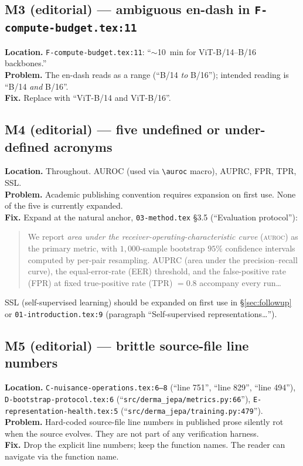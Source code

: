 \documentclass[11pt,a4paper]{article}
\begin{document}
\subsection*{M3 (editorial) --- ambiguous en-dash in
            \texttt{F-compute-budget.tex:11}}
\textbf{Location.} \texttt{F-compute-budget.tex:11}: ``$\sim$10~min for
ViT-B/14--B/16 backbones.''\\
\textbf{Problem.} The en-dash reads as a range (``B/14 \emph{to}
B/16''); intended reading is ``B/14 \emph{and} B/16''.\\
\textbf{Fix.} Replace with ``ViT-B/14 and ViT-B/16''.

\subsection*{M4 (editorial) --- five undefined or under-defined
            acronyms}
\textbf{Location.} Throughout. AUROC (used via \texttt{\textbackslash auroc}
macro), AUPRC, FPR, TPR, SSL.\\
\textbf{Problem.} Academic publishing convention requires expansion on
first use. None of the five is currently expanded.\\
\textbf{Fix.} Expand at the natural anchor, \texttt{03-method.tex} \S3.5
(``Evaluation protocol''):
\begin{quote}\small
We report \emph{area under the receiver-operating-characteristic curve}
(\textsc{auroc}) as the primary metric, with $1{,}000$-sample bootstrap
$95\%$ confidence intervals computed by per-pair resampling. AUPRC
(area under the precision--recall curve), the equal-error-rate (EER)
threshold, and the false-positive rate (FPR) at fixed true-positive
rate (TPR) $= 0.8$ accompany every run\dots
\end{quote}
SSL (self-supervised learning) should be expanded on first use in
\S\ref{sec:followup} or \texttt{01-introduction.tex:9} (paragraph
``Self-supervised representations\dots'').

\subsection*{M5 (editorial) --- brittle source-file line numbers}
\textbf{Location.} \texttt{C-nuisance-operations.tex:6--8} (``line 751'',
``line 829'', ``line 494''),
\texttt{D-bootstrap-protocol.tex:6} (``\texttt{src/derma\_jepa/metrics.py:66}''),
\texttt{E-representation-health.tex:5}
(``\texttt{src/derma\_jepa/training.py:479}'').\\
\textbf{Problem.} Hard-coded source-file line numbers in published
prose silently rot when the source evolves. They are not part of any
verification harness.\\
\textbf{Fix.} Drop the explicit line numbers; keep the function names.
The reader can navigate via the function name.
\end{document}
